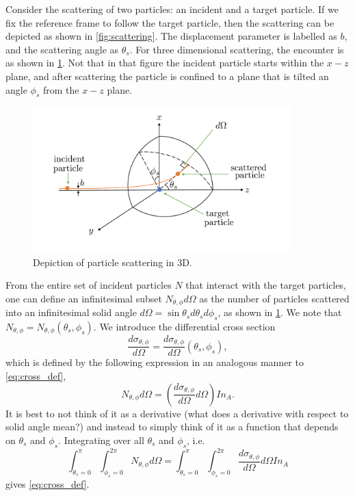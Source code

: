 \documentclass[a4paper,11pt]{report}
\begin{document}
Consider the scattering of two particles: an incident and a target particle. If we fix the reference frame to follow the target particle, then the scattering can be depicted as shown in \cref{fig:scattering}. The displacement parameter is labelled as $b$, and the scattering angle as $\theta_s$. For three dimensional scattering, the encounter is as shown in \cref{fig:scattering_3d}. Not that in that figure the incident particle starts within the $x-z$ plane, and after scattering the particle is confined to a plane that is tilted an angle $\phi_s$ from the $x-z$ plane.

\begin{figure}[ht]
    \centering
    \includegraphics[width=10cm]{../../images/scattering_3d.pdf}
    \caption{Depiction of particle scattering in 3D.}
    \label{fig:scattering_3d}
\end{figure}

From the entire set of incident particles $N$ that interact with the target particles, one can define an infinitesimal subset $N_{\theta,\phi} d\Omega$ as the number of particles scattered into an infinitesimal solid angle $d\Omega = \sin \theta_s d\theta_s d\phi_s$, as shown in \cref{fig:scattering_3d}. We note that $N_{\theta,\phi} = N_{\theta,\phi} (\theta_s, \phi_s)$. We introduce the differential cross section
\begin{equation}
    \frac{d\sigma_{\theta,\phi}}{d\Omega} = \frac{d\sigma_{\theta,\phi}}{d\Omega}(\theta_s,\phi_s),
\end{equation}
which is defined by the following expression in an analogous manner to \cref{eq:cross_def},
\begin{equation}
    \label{eq:cross_def_diff}
    N_{\theta, \phi} d\Omega = \left ( \frac{d\sigma_{\theta,\phi}}{d\Omega} d\Omega \right ) I n_A.
\end{equation}
It is best to not think of it as a derivative (what does a derivative with respect to solid angle mean?) and instead to simply think of it as a function that depends on $\theta_s$ and $\phi_s$. Integrating over all $\theta_s$ and $\phi_s$, i.e.
\begin{equation*}
    \int_{\theta_s = 0}^\pi \int_{\phi_s = 0}^{2\pi} N_{\theta, \phi} d\Omega = \int_{\theta_s = 0}^\pi \int_{\phi_s = 0}^{2\pi} \frac{d\sigma_{\theta,\phi}}{d\Omega}  d\Omega I n_A
\end{equation*}
gives \cref{eq:cross_def}.
\end{document}
